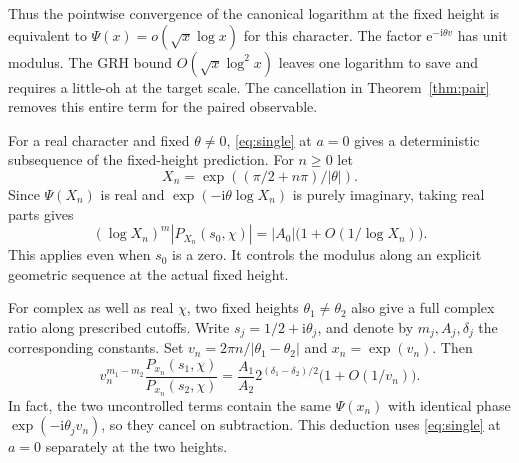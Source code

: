 \documentclass[11pt]{article}
\newcommand{\e}{\mathrm e}
\newcommand{\ii}{\mathrm i}
\begin{document}
Thus the pointwise convergence of the canonical logarithm at the fixed height is equivalent to $\Psi(x)=o(\sqrt{x}\log x)$ for this character. The factor $\e^{-\ii\theta v}$ has unit modulus. The GRH bound $O(\sqrt{x}\log^2 x)$ leaves one logarithm to save and requires a little-oh at the target scale. The cancellation in Theorem~\ref{thm:pair} removes this entire term for the paired observable.

For a real character and fixed $\theta\ne0$, \eqref{eq:single} at $a=0$ gives a deterministic subsequence of the fixed-height prediction. For $n\ge0$ let
\[
 X_n=\exp((\pi/2+n\pi)/|\theta|).
\]
Since $\Psi(X_n)$ is real and $\exp(-\ii\theta\log X_n)$ is purely imaginary, taking real parts gives
\[
 (\log X_n)^m |P_{X_n}(s_0,\chi)|=|A_0|\bigl(1+O(1/\log X_n)\bigr).
\]
This applies even when $s_0$ is a zero. It controls the modulus along an explicit geometric sequence at the actual fixed height.

For complex as well as real $\chi$, two fixed heights $\theta_1\ne\theta_2$ also give a full complex ratio along prescribed cutoffs. Write $s_j=1/2+\ii\theta_j$, and denote by $m_j,A_j,\delta_j$ the corresponding constants. Set $v_n=2\pi n/|\theta_1-\theta_2|$ and $x_n=\exp(v_n)$. Then
\[
 v_n^{m_1-m_2}\frac{P_{x_n}(s_1,\chi)}{P_{x_n}(s_2,\chi)}
 =\frac{A_1}{A_2}2^{(\delta_1-\delta_2)/2}
   \bigl(1+O(1/v_n)\bigr).
\]
In fact, the two uncontrolled terms contain the same $\Psi(x_n)$ with identical phase $\exp(-\ii\theta_j v_n)$, so they cancel on subtraction. This deduction uses \eqref{eq:single} at $a=0$ separately at the two heights.
\end{document}
